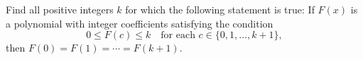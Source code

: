 Find all positive integers $k$ for which the following statement is true:
If $F(x)$ is a polynomial with integer coefficients satisfying the condition
\[ 0 \leq F(c) \leq k \quad \text{for each } c \in \{0, 1, \ldots, k+1\}, \]
then $F(0) = F(1) = \cdots = F(k+1)$.
